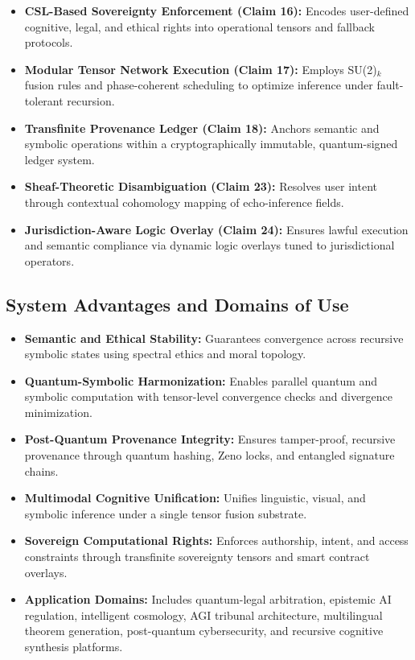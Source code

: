 \documentclass[12pt]{article}
\begin{document}
\begin{itemize}
    \item \textbf{CSL-Based Sovereignty Enforcement (Claim 16):} Encodes user-defined cognitive, legal, and ethical rights into operational tensors and fallback protocols.

    \item \textbf{Modular Tensor Network Execution (Claim 17):} Employs SU(2)\(_k\) fusion rules and phase-coherent scheduling to optimize inference under fault-tolerant recursion.

    \item \textbf{Transfinite Provenance Ledger (Claim 18):} Anchors semantic and symbolic operations within a cryptographically immutable, quantum-signed ledger system.

    \item \textbf{Sheaf-Theoretic Disambiguation (Claim 23):} Resolves user intent through contextual cohomology mapping of echo-inference fields.

    \item \textbf{Jurisdiction-Aware Logic Overlay (Claim 24):} Ensures lawful execution and semantic compliance via dynamic logic overlays tuned to jurisdictional operators.
\end{itemize}

\subsection*{System Advantages and Domains of Use}

\begin{itemize}
    \item \textbf{Semantic and Ethical Stability:} Guarantees convergence across recursive symbolic states using spectral ethics and moral topology.

    \item \textbf{Quantum-Symbolic Harmonization:} Enables parallel quantum and symbolic computation with tensor-level convergence checks and divergence minimization.

    \item \textbf{Post-Quantum Provenance Integrity:} Ensures tamper-proof, recursive provenance through quantum hashing, Zeno locks, and entangled signature chains.

    \item \textbf{Multimodal Cognitive Unification:} Unifies linguistic, visual, and symbolic inference under a single tensor fusion substrate.

    \item \textbf{Sovereign Computational Rights:} Enforces authorship, intent, and access constraints through transfinite sovereignty tensors and smart contract overlays.

    \item \textbf{Application Domains:} Includes quantum-legal arbitration, epistemic AI regulation, intelligent cosmology, AGI tribunal architecture, multilingual theorem generation, post-quantum cybersecurity, and recursive cognitive synthesis platforms.
\end{itemize}
\end{document}
